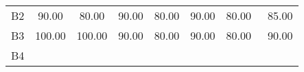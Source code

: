 \documentclass[9pt,journal,letterpaper,twocolumn]{IEEEtran}
\begin{document}
\begin{table}[!t]
{\begin{center}
\begin{tabular}{lc cc cccc}
					\hspace{-0.5em}B2  & \hspace{-0.5em}90.00\hspace{-0.5em}	& \hspace{-0.5em}80.00\hspace{-0.5em}	& \hspace{-0.5em}90.00\hspace{-0.5em}	& \hspace{-0.5em}80.00\hspace{-0.5em}	& \hspace{-0.5em}90.00\hspace{-0.5em}	& \hspace{-0.5em}80.00\hspace{-0.5em} & \hspace{-0.5em}~85.00\hspace{-0.5em}\\
					\hspace{-0.5em}B3 & \hspace{-0.5em}100.00\hspace{-0.5em}	& \hspace{-0.5em}100.00\hspace{-0.5em}	& \hspace{-0.5em}90.00\hspace{-0.5em}	& \hspace{-0.5em}80.00\hspace{-0.5em}	& \hspace{-0.5em}90.00\hspace{-0.5em}	& \hspace{-0.5em}80.00\hspace{-0.5em} & \hspace{-0.5em}~90.00\hspace{-0.5em}\\
					\hspace{-0.5em}B4 & \hspace{-0.5em}{100.00}\hspace{-0.5em} &	\hspace{-0.5em}{100.00}\hspace{-0.5em} & \hspace{-0.5em}{90.00}\hspace{-0.5em}	& \hspace{-0.5em}{90.00}\hspace{-0.5em} & \hspace{-0.5em}{90.00}\hspace{-0.5em}	& \hspace{-0.5em}{80.00}\hspace{-0.5em} & \hspace{-0.5em}{91.67}\hspace{-0.5em}  \\

\end{tabular}
\end{center}}
\end{table}
\end{document}
